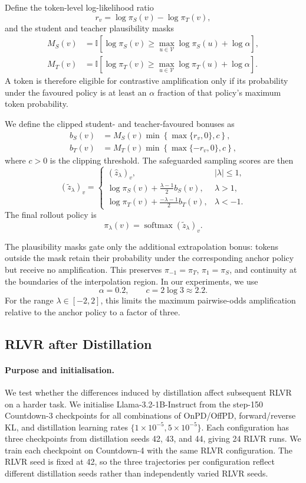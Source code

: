 \documentclass{article} %
\theoremstyle{plain}
\theoremstyle{definition}
\theoremstyle{remark}
\begin{document}
Define the token-level log-likelihood ratio
\[
r_v
=
\log\pi_S(v)-\log\pi_T(v),
\]
and the student and teacher plausibility masks
\begin{align}
M_S(v)
&=
\mathbb{I}\left[
\log\pi_S(v)
\geq
\max_{u\in\mathcal{V}}\log\pi_S(u)+\log\alpha
\right],
\\
M_T(v)
&=
\mathbb{I}\left[
\log\pi_T(v)
\geq
\max_{u\in\mathcal{V}}\log\pi_T(u)+\log\alpha
\right].
\end{align}
A token is therefore eligible for contrastive amplification only if its probability under the favoured policy is at least an \(\alpha\) fraction of that policy's maximum token probability.

We define the clipped student- and teacher-favoured bonuses as
\begin{align}
b_S(v)
&=
M_S(v)\min\!\left\{\max\{r_v,0\},c\right\},
\\
b_T(v)
&=
M_T(v)\min\!\left\{\max\{-r_v,0\},c\right\},
\end{align}
where \(c>0\) is the clipping threshold. The safeguarded sampling scores are then
\[
(\tilde z_\lambda)_v
=
\begin{cases}
(\hat z_\lambda)_v,
& |\lambda|\leq 1,\\[4pt]
\log\pi_S(v)
+
\displaystyle\frac{\lambda-1}{2}b_S(v),
& \lambda>1,\\[8pt]
\log\pi_T(v)
+
\displaystyle\frac{-\lambda-1}{2}b_T(v),
& \lambda<-1.
\end{cases}
\]
The final rollout policy is
\[
\pi_\lambda(v)
=
\operatorname{softmax}(\tilde z_\lambda)_v.
\]

The plausibility masks gate only the additional extrapolation bonus: tokens outside the mask retain their probability under the corresponding anchor policy but receive no amplification. This preserves \(\pi_{-1}=\pi_T\), \(\pi_1=\pi_S\), and continuity at the boundaries of the interpolation region. In our experiments, we use
\[
\alpha=0.2,
\qquad
c=2\log 3 \approx 2.2.
\]
For the range \(\lambda\in[-2,2]\), this limits the maximum pairwise-odds amplification relative to the anchor policy to a factor of three.

\subsection{RLVR after Distillation}
\label{app:downstream_rlvr}

\paragraph{Purpose and initialisation.}
We test whether the differences induced by distillation affect subsequent RLVR on a harder task. We initialise Llama-3.2-1B-Instruct from the step-150 Countdown-3 checkpoints for all combinations of OnPD/OffPD, forward/reverse KL, and distillation learning rates $\{1\times10^{-5},5\times10^{-5}\}$. Each configuration has three checkpoints from distillation seeds 42, 43, and 44, giving 24 RLVR runs. We train each checkpoint on Countdown-4 with the same RLVR configuration. The RLVR seed is fixed at 42, so the three trajectories per configuration reflect different distillation seeds rather than independently varied RLVR seeds.
\end{document}
